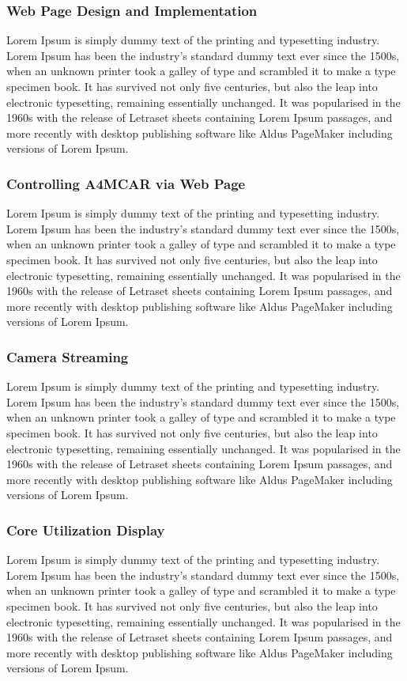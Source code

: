\subsubsection{Web Page Design and Implementation}  %
Lorem Ipsum is simply dummy text of the printing and typesetting industry. Lorem Ipsum has been the industry's standard dummy text ever since the 1500s, when an unknown printer took a galley of type and scrambled it to make a type specimen book. It has survived not only five centuries, but also the leap into electronic typesetting, remaining essentially unchanged. It was popularised in the 1960s with the release of Letraset sheets containing Lorem Ipsum passages, and more recently with desktop publishing software like Aldus PageMaker including versions of Lorem Ipsum.

\subsubsection{Controlling A4MCAR via Web Page}
Lorem Ipsum is simply dummy text of the printing and typesetting industry. Lorem Ipsum has been the industry's standard dummy text ever since the 1500s, when an unknown printer took a galley of type and scrambled it to make a type specimen book. It has survived not only five centuries, but also the leap into electronic typesetting, remaining essentially unchanged. It was popularised in the 1960s with the release of Letraset sheets containing Lorem Ipsum passages, and more recently with desktop publishing software like Aldus PageMaker including versions of Lorem Ipsum.

\subsubsection{Camera Streaming}
Lorem Ipsum is simply dummy text of the printing and typesetting industry. Lorem Ipsum has been the industry's standard dummy text ever since the 1500s, when an unknown printer took a galley of type and scrambled it to make a type specimen book. It has survived not only five centuries, but also the leap into electronic typesetting, remaining essentially unchanged. It was popularised in the 1960s with the release of Letraset sheets containing Lorem Ipsum passages, and more recently with desktop publishing software like Aldus PageMaker including versions of Lorem Ipsum.

\subsubsection{Core Utilization Display}
Lorem Ipsum is simply dummy text of the printing and typesetting industry. Lorem Ipsum has been the industry's standard dummy text ever since the 1500s, when an unknown printer took a galley of type and scrambled it to make a type specimen book. It has survived not only five centuries, but also the leap into electronic typesetting, remaining essentially unchanged. It was popularised in the 1960s with the release of Letraset sheets containing Lorem Ipsum passages, and more recently with desktop publishing software like Aldus PageMaker including versions of Lorem Ipsum.

